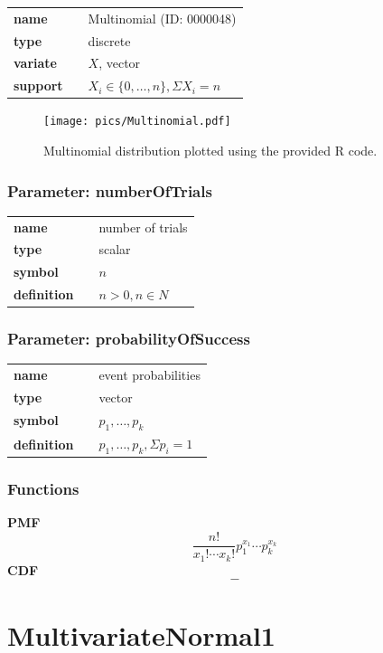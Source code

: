 \documentclass{article}
\begin{document}
  \bigskip 

\begin{tabular}{p{2cm}cl}
\textbf{name} & & Multinomial (ID: 0000048)\\ 
 
\textbf{type} & & discrete \\ 

\textbf{variate} & & $X$, vector \\ 

\textbf{support} & & $X_i \in \{0,\dots,n\}, \Sigma X_i = n$
\end{tabular}

\begin{figure}[ht!]
\centering
  \texttt{[image: pics/Multinomial.pdf]}
 \caption{Multinomial distribution plotted using the provided R code.}
 \label{fig:Multinomial}
\end{figure}

\subsubsection*{Parameter: numberOfTrials}

\noindent\begin{tabular}{p{2cm}cl}
\textbf{name} & & number of trials \\
\textbf{type} & & scalar \\
\textbf{symbol} & & $n$  \\
\textbf{definition} & & $n > 0, n \in N$
\end{tabular}
\subsubsection*{Parameter: probabilityOfSuccess}

\noindent\begin{tabular}{p{2cm}cl}
\textbf{name} & & event probabilities \\
\textbf{type} & & vector \\
\textbf{symbol} & & $p_1, \ldots, p_k$  \\
\textbf{definition} & & $p_1, \ldots, p_k, \Sigma p_i = 1$
\end{tabular}
\subsubsection*{Functions}

\smallskip \noindent \hspace{.2cm} \textbf{PMF} 
\begin{equation*}\frac{n!}{x_1!\cdots x_k!} p_1^{x_1} \cdots p_k^{x_k}\end{equation*}
\smallskip \noindent \hspace{.2cm} \textbf{CDF} 
\begin{equation*}-\end{equation*}
\smallskip\section*{MultivariateNormal1} 
\end{document}
